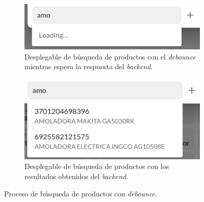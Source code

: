 \begin{figure}[H]
    \centering
    \begin{subfigure}{0.45\linewidth}
        \centering
        \includegraphics[width=\linewidth]{figures/design_develop/screenshots/busqueda_debounced_loading.png}
        \caption{Desplegable de búsqueda de productos con el \textit{debounce} mientras espera la respuesta del \textit{backend}.}
    \end{subfigure}
    \hfill
    \begin{subfigure}{0.45\linewidth}
        \centering
        \includegraphics[width=\linewidth]{figures/design_develop/screenshots/busqueda_debounced.png}
        \caption{Desplegable de búsqueda de productos con los resultados obtenidos del \textit{backend}.}
    \end{subfigure}
    \caption{Proceso de búsqueda de productos con \textit{debounce}.}
    \label{fig:dev:ss:busqueda_debounced}
\end{figure}